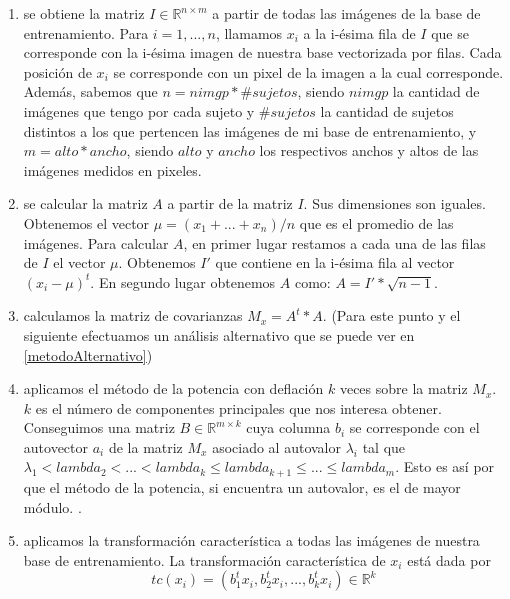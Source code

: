 \begin{enumerate}
 \item se obtiene la matriz $I\in\mathbb{R}^{n \times m}$ a partir de todas las imágenes de la base de entrenamiento. Para $i = 1,...,n$, llamamos $x_i$ a
 la i-ésima fila de $I$ que se corresponde con la i-ésima imagen de nuestra base vectorizada por filas. Cada posición de $x_i$ se 
 corresponde con un pixel de la imagen a la cual corresponde. Además, sabemos que $n = nimgp * \#sujetos$, siendo $nimgp$ la cantidad de imágenes
 que tengo por cada sujeto y $\#sujetos$ la cantidad de sujetos distintos a los que pertencen las imágenes de mi base de entrenamiento, y 
 $m = alto * ancho$, siendo $alto$ y $ancho$ los respectivos anchos y altos de las imágenes medidos en pixeles.
 
 \item se calcular la matriz $A$ a partir de la matriz $I$. Sus dimensiones son iguales. Obtenemos el vector $\mu = (x_1+...+x_n)/n$ que es 
 el promedio de las imágenes. Para calcular $A$, en primer lugar restamos a cada una de las filas de $I$ el vector $\mu$. Obtenemos $I'$ que contiene en la
 i-ésima fila al vector $(x_i - \mu)^t$. En segundo lugar obtenemos $A$ como: $A = I' * \sqrt{n-1}$.
 
 \item calculamos la matriz de covarianzas $M_x = A^t*A$. (Para este punto y el siguiente efectuamos un análisis alternativo que se puede ver en \ref{metodoAlternativo})
 
 \item aplicamos el método de la potencia con deflación $k$ veces sobre la matriz $M_x$. $k$ es el número de componentes principales que nos 
 interesa obtener. Conseguimos una matriz $B\in\mathbb{R}^{m \times k}$ cuya columna $b_i$ se corresponde con el autovector $a_i$ de la matriz
 $M_x$ asociado al autovalor $\lambda_i$ tal que $\lambda_1 < lambda_2 < ... < lambda_k \leq lambda_{k+1} \leq ... \leq lambda_m$. Esto es así
 por que el método de la potencia, si encuentra un autovalor, es el de mayor módulo. \cite{burden}.
 
 \item aplicamos la transformación característica a todas las imágenes de nuestra base de entrenamiento. La transformación característica
 de $x_i$ está dada por \begin{displaymath}
			    tc(x_i) = ({b_1^t}x_i, {b_2^t}x_i,..., {b_k^t}x_i)\in\mathbb{R}^k
                        \end{displaymath}
\end{enumerate}
